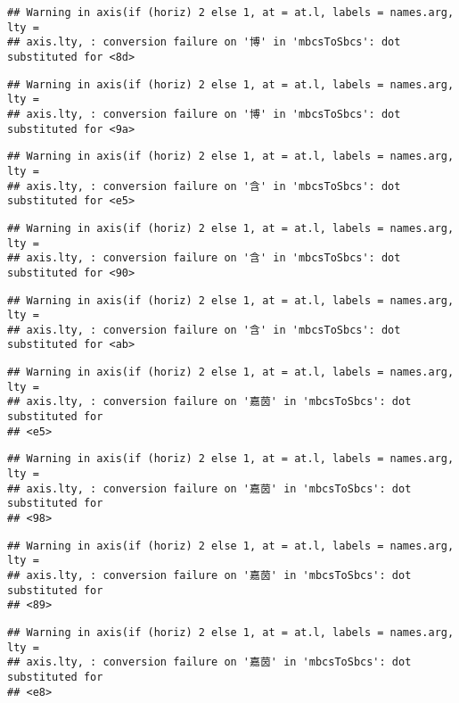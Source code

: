 \documentclass[
]{article}
\begin{document}
\begin{verbatim}
## Warning in axis(if (horiz) 2 else 1, at = at.l, labels = names.arg, lty =
## axis.lty, : conversion failure on '博' in 'mbcsToSbcs': dot substituted for <8d>
\end{verbatim}

\begin{verbatim}
## Warning in axis(if (horiz) 2 else 1, at = at.l, labels = names.arg, lty =
## axis.lty, : conversion failure on '博' in 'mbcsToSbcs': dot substituted for <9a>
\end{verbatim}

\begin{verbatim}
## Warning in axis(if (horiz) 2 else 1, at = at.l, labels = names.arg, lty =
## axis.lty, : conversion failure on '含' in 'mbcsToSbcs': dot substituted for <e5>
\end{verbatim}

\begin{verbatim}
## Warning in axis(if (horiz) 2 else 1, at = at.l, labels = names.arg, lty =
## axis.lty, : conversion failure on '含' in 'mbcsToSbcs': dot substituted for <90>
\end{verbatim}

\begin{verbatim}
## Warning in axis(if (horiz) 2 else 1, at = at.l, labels = names.arg, lty =
## axis.lty, : conversion failure on '含' in 'mbcsToSbcs': dot substituted for <ab>
\end{verbatim}

\begin{verbatim}
## Warning in axis(if (horiz) 2 else 1, at = at.l, labels = names.arg, lty =
## axis.lty, : conversion failure on '嘉茵' in 'mbcsToSbcs': dot substituted for
## <e5>
\end{verbatim}

\begin{verbatim}
## Warning in axis(if (horiz) 2 else 1, at = at.l, labels = names.arg, lty =
## axis.lty, : conversion failure on '嘉茵' in 'mbcsToSbcs': dot substituted for
## <98>
\end{verbatim}

\begin{verbatim}
## Warning in axis(if (horiz) 2 else 1, at = at.l, labels = names.arg, lty =
## axis.lty, : conversion failure on '嘉茵' in 'mbcsToSbcs': dot substituted for
## <89>
\end{verbatim}

\begin{verbatim}
## Warning in axis(if (horiz) 2 else 1, at = at.l, labels = names.arg, lty =
## axis.lty, : conversion failure on '嘉茵' in 'mbcsToSbcs': dot substituted for
## <e8>
\end{verbatim}
\end{document}
